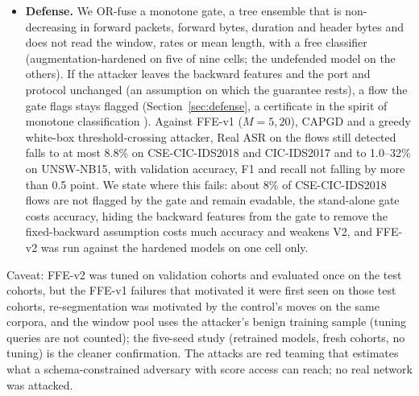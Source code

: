 \begin{itemize}
    \item \textbf{Defense.} We OR-fuse a monotone gate, a tree ensemble that is non-decreasing in forward packets, forward bytes, duration and header bytes and does not read the window, rates or mean length, with a free classifier (augmentation-hardened on five of nine cells; the undefended model on the others). If the attacker leaves the backward features and the port and protocol unchanged (an assumption on which the guarantee rests), a flow the gate flags stays flagged (Section~\ref{sec:defense}, a certificate in the spirit of monotone classification \cite{incer2018adversarially}). Against FFE-v1 ($M=5,20$), CAPGD and a greedy white-box threshold-crossing attacker, Real ASR on the flows still detected falls to at most 8.8\% on CSE-CIC-IDS2018 and CIC-IDS2017 and to 1.0--32\% on UNSW-NB15, with validation accuracy, F1 and recall not falling by more than 0.5 point. We state where this fails: about 8\% of CSE-CIC-IDS2018 flows are not flagged by the gate and remain evadable, the stand-alone gate costs accuracy, hiding the backward features from the gate to remove the fixed-backward assumption costs much accuracy and weakens V2, and FFE-v2 was run against the hardened models on one cell only.
\end{itemize}
Caveat: FFE-v2 was tuned on validation cohorts and evaluated once on the test cohorts, but the FFE-v1 failures that motivated it were first seen on those test cohorts, re-segmentation was motivated by the control's moves on the same corpora, and the window pool uses the attacker's benign training sample (tuning queries are not counted); the five-seed study (retrained models, fresh cohorts, no tuning) is the cleaner confirmation. The attacks are red teaming that estimates what a schema-constrained adversary with score access can reach; no real network was attacked.
